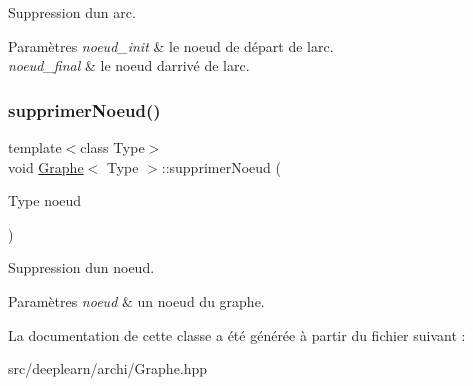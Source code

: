 Suppression d\textquotesingle{}un arc. 


\begin{DoxyParams}{Paramètres}
{\em noeud\+\_\+init} & le noeud de départ de l\textquotesingle{}arc. \\
\hline
{\em noeud\+\_\+final} & le noeud d\textquotesingle{}arrivé de l\textquotesingle{}arc. \\
\hline
\end{DoxyParams}
\mbox{\label{classGraphe_a5887c7cd72bcf4b5f8c169a22b5180f1}} 
\subsubsection{\texorpdfstring{supprimer\+Noeud()}{supprimerNoeud()}}
{\footnotesize\ttfamily template$<$class Type$>$ \\
void \hyperlink{classGraphe}{Graphe}$<$ Type $>$\+::supprimer\+Noeud (\begin{DoxyParamCaption}\item[{Type}]{noeud }\end{DoxyParamCaption})}



Suppression d\textquotesingle{}un noeud. 


\begin{DoxyParams}{Paramètres}
{\em noeud} & un noeud du graphe. \\
\hline
\end{DoxyParams}


La documentation de cette classe a été générée à partir du fichier suivant \+:\begin{DoxyCompactItemize}
\item 
src/deeplearn/archi/Graphe.\+hpp\end{DoxyCompactItemize}
